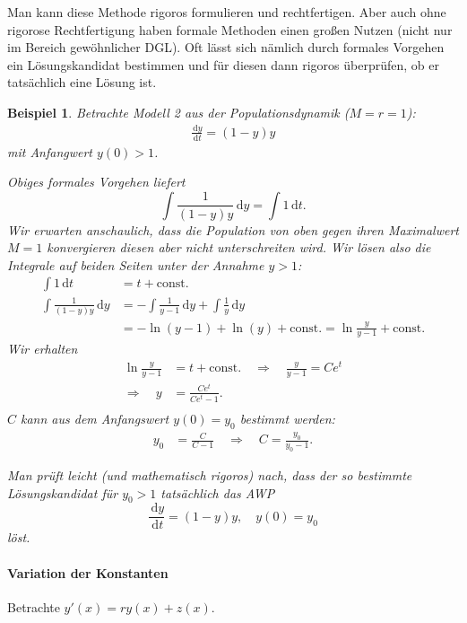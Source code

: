 \documentclass[12pt,a4paper]{book}
\theoremstyle{break}
\newtheorem{beispiel}[theorem]{Beispiel}
\theoremstyle{nonumberplain}
\newcommand{\1}{\mathbbm{1}} 			      	%
\newcommand{\dx}[1][x]{\ensuremath{\, \mathrm{d} #1}} 	%
\begin{document}
Man kann diese Methode rigoros formulieren und rechtfertigen. %
Aber auch ohne rigorose Rechtfertigung haben formale Methoden einen großen Nutzen
(nicht nur im Bereich gewöhnlicher DGL). Oft lässt sich nämlich durch formales Vorgehen ein Lösungskandidat bestimmen und für diesen dann rigoros überprüfen, ob er tatsächlich eine Lösung ist. 


\begin{beispiel}
Betrachte Modell 2 aus der Populationsdynamik ($M=r=1$):
\begin{align*}
\frac{\dx[y]}{\dx[t]} = \left(1-y\right) y
\end{align*}
mit Anfangwert $y(0)>1$. 

Obiges formales Vorgehen liefert
\[
\int \frac{1}{\left(1-y\right)y} \dx[y]  =\int 1 \dx[t].
\]
Wir erwarten anschaulich, dass die Population von oben gegen ihren Maximalwert $M=1$ konvergieren 
diesen aber nicht unterschreiten wird. Wir lösen also die Integrale auf beiden Seiten unter der
Annahme $y>1$:
\begin{align*}
\int 1 \dx[t] &= t + \mbox{const.}\\
\int \frac{1}{\left(1-y\right)y} \dx[y] 
&= - \int \frac{1}{y-1} \dx[y] + \int \frac{1}{y} \dx[y]\\
&= - \ln (y-1) + \ln (y) + \mbox{const.}=\ln \frac{y}{y-1} + \mbox{const.}
\end{align*}
Wir erhalten
\begin{align*}
\ln \frac{y}{y-1} &= t + \mbox{const.} \quad 
\Longrightarrow \quad \frac{y}{y-1} = C e^t\\
\Longrightarrow \quad y &= \frac{Ce^t}{Ce^t-1}.\\
\end{align*}
$C$ kann aus dem Anfangswert $y(0)=y_0$ bestimmt werden:
\begin{align*}
y_0 &= \frac{C}{C-1} \quad \Longrightarrow \quad  C=\frac{y_0}{y_0-1}.
\end{align*}

Man prüft leicht (und mathematisch rigoros) nach, dass der so bestimmte Lösungskandidat für $y_0>1$ tatsächlich
das AWP
\[
\frac{\dx[y]}{\dx[t]} =\left(1-y\right) y,  \quad y(0)=y_0
\]
löst. 
\end{beispiel}

\paragraph{Variation der Konstanten}

Betrachte $y'(x)=r y(x) + z(x)$.
\end{document}
